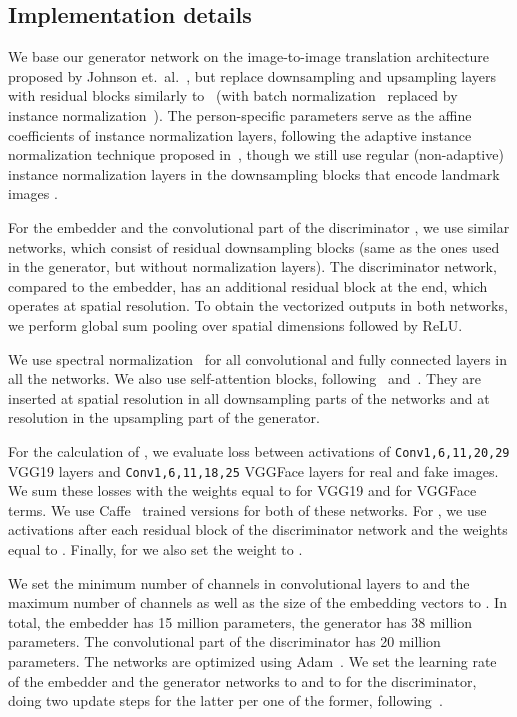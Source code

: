 \documentclass[10pt,twocolumn,letterpaper]{article}
\begin{document}
\subsection{Implementation details}

We base our generator network  on the image-to-image translation architecture proposed by Johnson et.\ al.~\cite{Johnson16}, but replace downsampling and upsampling layers with residual blocks similarly to~\cite{Brock18} (with batch normalization~\cite{Ioffe15} replaced by instance normalization~\cite{Ulyanov16}). The person-specific parameters  serve as the affine coefficients of instance normalization layers, following the adaptive instance normalization technique proposed in~\cite{Huang17}, though we still use regular (non-adaptive) instance normalization layers in the downsampling blocks that encode landmark images .

For the embedder  and the convolutional part of the discriminator , we use similar networks, which consist of residual downsampling blocks (same as the ones used in the generator, but without normalization layers). The discriminator network, compared to the embedder, has an additional residual block at the end, which operates at  spatial resolution. To obtain the vectorized outputs in both networks, we perform global sum pooling over spatial dimensions followed by ReLU. 

We use spectral normalization~\cite{Miyato18b} for all convolutional and fully connected layers in all the networks. We also use self-attention blocks, following~\cite{Brock18} and~\cite{Zhang18b}. They are inserted at  spatial resolution in all downsampling parts of the networks and at  resolution in the upsampling part of the generator.

For the calculation of , we evaluate  loss between activations of \texttt{Conv1,6,11,20,29} VGG19 layers and \texttt{Conv1,6,11,18,25} VGGFace layers for real and fake images. We sum these losses with the weights equal to  for VGG19 and  for VGGFace terms. We use Caffe~\cite{Jia14} trained versions for both of these networks. For , we use activations after each residual block of the discriminator network and the weights equal to . Finally, for  we also set the weight to .

We set the minimum number of channels in convolutional layers to  and the maximum number of channels as well as the size  of the embedding vectors to . In total, the embedder has 15 million parameters, the generator has 38 million parameters. The convolutional part of the discriminator has 20 million parameters. The networks are optimized using Adam~\cite{Diederik14}. We set the learning rate of the embedder and the generator networks to  and to  for the discriminator, doing two update steps for the latter per one of the former, following~\cite{Zhang18b}.
\end{document}
